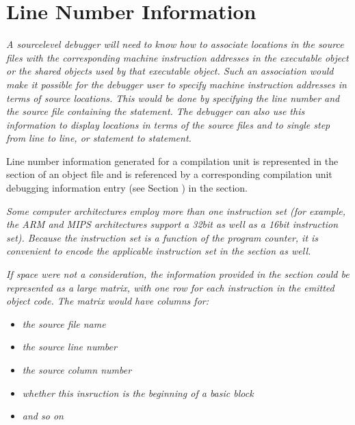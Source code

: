 \section{Line Number Information}
\label{chap:linenumberinformation}
\textit{A source\dash level debugger will need to know how to
associate locations in the source files with the corresponding
machine instruction addresses in the executable object or
the shared objects used by that executable object. Such an
association would make it possible for the debugger user
to specify machine instruction addresses in terms of source
locations. This would be done by specifying the line number
and the source file containing the statement. The debugger
can also use this information to display locations in terms
of the source files and to single step from line to line,
or statement to statement.}

Line number information generated for a compilation unit is
represented in the 
 section of an object file and
is referenced by a corresponding compilation unit debugging
information entry 
(see Section ) 
in the 
section.

\textit{Some computer architectures employ more than one instruction
set (for example, the ARM and MIPS architectures support
a 32\dash bit as well as a 16\dash bit instruction set). Because the
instruction set is a function of the program counter, it is
convenient to encode the applicable instruction set in the
 section as well.}

\textit{If space were not a consideration, the information provided
in the  
section could be represented as a large
matrix, with one row for each instruction in the emitted
object code. The matrix would have columns for:}

\begin{itemize}
\item \textit{the source file name}
\item \textit{the source line number}
\item \textit{the source column number}
\item \textit{whether this insruction is the beginning of a basic block}
\item \textit{and so on}
\end{itemize}

